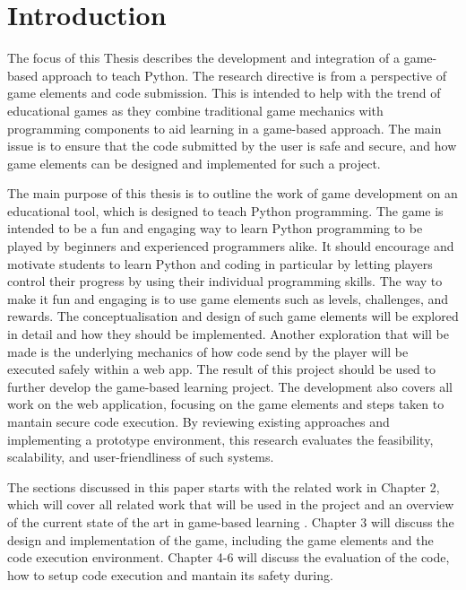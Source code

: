 \section{Introduction}
The focus of this Thesis describes the development and integration of a game-based approach to teach Python. The research directive is from a perspective of game elements and code submission. This is intended to help with the trend of educational games as they combine traditional game mechanics with programming components to aid learning in a game-based approach. The main issue is to ensure that the code submitted by the user is safe and secure, and how game elements can be designed and implemented for such a project.

The main purpose of this thesis is to outline the work of game development on an educational tool, which is designed to teach Python programming. The game is intended to be a fun and engaging way to learn Python programming to be played by beginners and experienced programmers alike.  It should encourage and motivate students to learn Python and coding in particular by letting players control their progress by using their individual programming skills. The way to make it fun and engaging is to use game elements such as levels, challenges, and rewards. The conceptualisation and design of such game elements will be explored in detail and how they should be implemented. Another exploration that will be made is the underlying mechanics of how code send by the player will be executed safely within a web app. The result of this project should be used to further develop the game-based learning project. The development also covers all work on the web application, focusing on the game elements and steps taken to mantain secure code execution. By reviewing existing approaches and implementing a prototype environment, this research evaluates the feasibility, scalability, and user-friendliness of such systems.

The sections discussed in this paper starts with the related work in Chapter 2, which will cover all related work that will be used in the project and an overview of the current state of the art in game-based learning . Chapter 3 will discuss the design and implementation of the game, including the game elements and the code execution environment. Chapter 4-6 will discuss the evaluation of the code, how to setup code execution and mantain its safety during.